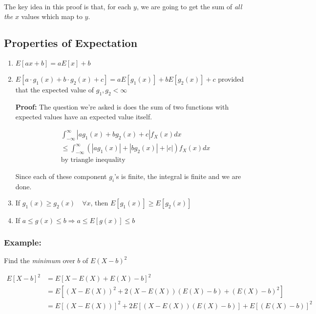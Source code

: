 \documentclass{article}
\begin{document}
\noindent The key idea in this proof is that, for each $y$, we are going to get the sum of \textit{all the} $x$ values which map to $y$.

\subsection{Properties of Expectation}
\begin{enumerate}
    \item $E[ax+b] = aE[x] + b$
    \item $E[a\cdot g_1(x) + b\cdot g_2(x) + c] = a E[g_1(x)] + bE[g_2(x)] + c$ provided that the expected value of $g_1, g_2 < \infty$ 
    
    \textbf{Proof:} The question we're asked is does the sum of two functions with expected values have an expected value itself. 
    
    \begin{equation*}
    \begin{split}
        &\int_{-\infty}^\infty |a g_1(x) + b g_2(x) + c| f_X(x) dx\\
        &\leq \int_{-\infty}^\infty \left(|a g_1(x)| + |b g_2(x)| + |c|\right) f_X(x) dx\\
        &\text{by triangle inequality}
    \end{split}
    \end{equation*}
    
    Since each of these component $g_i$'s is finite, the integral is finite and we are done.
    
    \item If $g_1(x) \geq g_2(x) \quad \forall x$, then $E[g_1(x)] \geq E[g_2(x)]$
    
    \item If $a \leq g(x) \leq b \Rightarrow a \leq E[g(x)] \leq b$
\end{enumerate}

\subsubsection*{Example:}

Find the \textit{minimum} over $b$ of $E(X-b)^2$

\begin{equation*}
    \begin{split}
        E[X-b]^2 &= E[X-E(X) + E(X) - b]^2\\
        &= E[(X-E(X))^2 + 2(X-E(X))(E(X)-b) + (E(X)-b)^2]\\
        &= E[(X-E(X))]^2 + 2E[(X-E(X))(E(X)-b)] + E[(E(X)-b)]^2\\
    \end{split}
\end{equation*}
\end{document}
